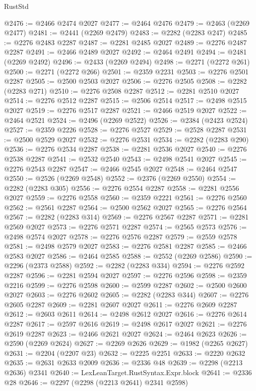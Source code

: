 \begin{lexlean}{RustStd}
\begin{coremodule}
{\begin{coremodule}
{{{{{{{{{{{{{{{{{{{{{{{{{{{{{{{{{{{{{{{{{{{{{{{{{{{{{{@2476 := @2466 @2474 @2027
@2477 := @2464 @2476
@2479 := @2463 (@2269 @2477)
@2481 := @2441 (@2269 @2479)
@2483 := @2282 (@2283 @247)
@2485 := @2276 @2483 @2287
@2487 := @2281 @2485 @2027
@2489 := @2276 @2487 @2287
@2491 := @2466 @2489 @2027
@2492 := @2464 @2491
@2494 := @2481 (@2269 @2492)
@2496 := @2433 (@2269 @2494)
@2498 := @2271 (@2272 @261)
@2500 := @2271 (@2272 @266)
@2501 := @2359 @2231
@2503 := @2276 @2501 @2287
@2505 := @2500 @2503 @2027
@2506 := @2276 @2505
@2508 := @2282 (@2283 @271)
@2510 := @2276 @2508 @2287
@2512 := @2281 @2510 @2027
@2514 := @2276 @2512 @2287
@2515 := @2506 @2514
@2517 := @2498 @2515 @2027
@2519 := @2276 @2517 @2287
@2521 := @2466 @2519 @2027
@2522 := @2464 @2521
@2524 := @2496 (@2269 @2522)
@2526 := @2384 (@2423 @2524)
@2527 := @2359 @2226
@2528 := @2276 @2527
@2529 := @2528 @2287
@2531 := @2500 @2529 @2027
@2532 := @2276 @2531
@2534 := @2282 (@2283 @290)
@2536 := @2276 @2534 @2287
@2538 := @2281 @2536 @2027
@2540 := @2276 @2538 @2287
@2541 := @2532 @2540
@2543 := @2498 @2541 @2027
@2545 := @2276 @2543 @2287
@2547 := @2466 @2545 @2027
@2548 := @2464 @2547
@2550 := @2526 (@2269 @2548)
@2552 := @2376 (@2269 @2550)
@2554 := @2282 (@2283 @305)
@2556 := @2276 @2554 @2287
@2558 := @2281 @2556 @2027
@2559 := @2276 @2558
@2560 := @2359 @2221
@2561 := @2276 @2560
@2562 := @2561 @2287
@2564 := @2500 @2562 @2027
@2565 := @2276 @2564
@2567 := @2282 (@2283 @314)
@2569 := @2276 @2567 @2287
@2571 := @2281 @2569 @2027
@2573 := @2276 @2571 @2287
@2574 := @2565 @2573
@2576 := @2498 @2574 @2027
@2578 := @2276 @2576 @2287
@2579 := @2559 @2578
@2581 := @2498 @2579 @2027
@2583 := @2276 @2581 @2287
@2585 := @2466 @2583 @2027
@2586 := @2464 @2585
@2588 := @2552 (@2269 @2586)
@2590 := @2296 (@2373 @2588)
@2592 := @2282 (@2283 @334)
@2594 := @2276 @2592 @2287
@2596 := @2281 @2594 @2027
@2597 := @2276 @2596
@2598 := @2359 @2216
@2599 := @2276 @2598
@2600 := @2599 @2287
@2602 := @2500 @2600 @2027
@2603 := @2276 @2602
@2605 := @2282 (@2283 @344)
@2607 := @2276 @2605 @2287
@2609 := @2281 @2607 @2027
@2611 := @2276 @2609 @2287
@2612 := @2603 @2611
@2614 := @2498 @2612 @2027
@2616 := @2276 @2614 @2287
@2617 := @2597 @2616
@2619 := @2498 @2617 @2027
@2621 := @2276 @2619 @2287
@2623 := @2466 @2621 @2027
@2624 := @2464 @2623
@2626 := @2590 (@2269 @2624)
@2627 := @2269 @2626
@2629 := @1982 (@2265 @2627)
@2631 := @2204 (@2207 @23)
@2632 := @2225 @2251
@2633 := @2220 @2632
@2635 := @2631 @2633 @2009
@2636 := @2336 @48
@2639 := @2298 (@2213 @2636) @2341
@2640 := LexLeanTarget.RustSyntax.Expr.block
@2641 := @2336 @28
@2646 := @2297 (@2298 (@2213 @2641) @2341 @2598)
}}}}}}}}}}}}}}}}}}}}}}}}}}}}}}}}}}}}}}}}}}}}}}}}}}}}}}
\end{coremodule}}
\end{coremodule}
\end{lexlean}
